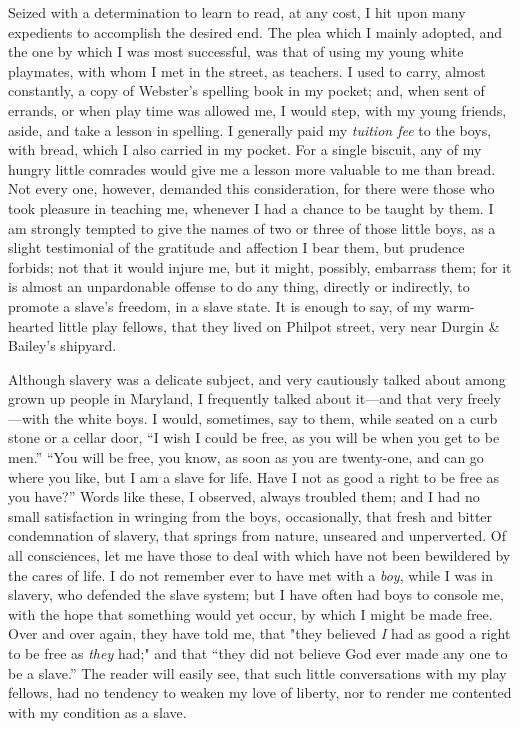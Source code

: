 Seized with a determination to learn to read, at any cost, I hit upon
many expedients to accomplish the desired end. The plea which I mainly
adopted, and the one by which I was most successful, was that of using
my young white playmates, with whom I met in the street, as teachers. I
used to carry, almost constantly, a copy of Webster's spelling book in
my pocket; and, when sent of errands, or when play time was allowed me,
I would step, with my young friends, aside, and take a lesson in
spelling. I generally paid my \emph{tuition fee} to the boys, with
bread, which I also carried in my pocket. For a single biscuit, any of
my hungry little comrades would give me a lesson more valuable to me
than bread. Not every one, however, demanded this consideration, for
there were those who took pleasure in teaching me, whenever I had a
chance to be taught by them. I am strongly tempted to give the names of
two or three of those little boys, as a slight testimonial of the
gratitude and affection I bear them, but prudence forbids; not that it
would injure me, but it might, possibly, embarrass them; for it is
almost an unpardonable offense to do any thing, directly or indirectly,
to promote a slave's freedom, in a slave state. It is enough to say, of
my warm-hearted little play fellows, that they lived on Philpot street,
very near Durgin \& Bailey's shipyard.

Although slavery was a delicate subject, and very cautiously talked
about among grown up people in Maryland, I frequently talked about
it---and that very {}freely---with the white boys. I would, sometimes,
say to them, while seated on a curb stone or a cellar door, ``I wish I
could be free, as you will be when you get to be men.'' ``You will be
free, you know, as soon as you are twenty-one, and can go where you
like, but I am a slave for life. Have I not as good a right to be free
as you have?'' Words like these, I observed, always troubled them; and I
had no small satisfaction in wringing from the boys, occasionally, that
fresh and bitter condemnation of slavery, that springs from nature,
unseared and unperverted. Of all consciences, let me have those to deal
with which have not been bewildered by the cares of life. I do not
remember ever to have met with a \emph{boy}, while I was in slavery, who
defended the slave system; but I have often had boys to console me, with
the hope that something would yet occur, by which I might be made free.
Over and over again, they have told me, that "they believed \emph{I} had
as good a right to be free as \emph{they} had;" and that ``they did not
believe God ever made any one to be a slave.'' The reader will easily
see, that such little conversations with my play fellows, had no
tendency to weaken my love of liberty, nor to render me contented with
my condition as a slave.

